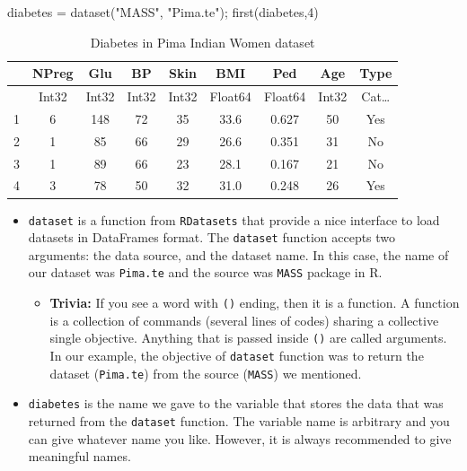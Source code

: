 \documentclass[
  letterpaper,
]{book}
\newenvironment{Shaded}{\begin{snugshade}}{\end{snugshade}}
\newcommand{\FloatTok}[1]{\textcolor[rgb]{0.68,0.00,0.00}{#1}}
\newcommand{\FunctionTok}[1]{\textcolor[rgb]{0.28,0.35,0.67}{#1}}
\newcommand{\NormalTok}[1]{\textcolor[rgb]{0.00,0.23,0.31}{#1}}
\newcommand{\OperatorTok}[1]{\textcolor[rgb]{0.37,0.37,0.37}{#1}}
\newcommand{\StringTok}[1]{\textcolor[rgb]{0.13,0.47,0.30}{#1}}
\providecommand{\tightlist}{%
  \setlength{\itemsep}{0pt}\setlength{\parskip}{0pt}}\usepackage{longtable,booktabs,array}
\begin{document}
\begin{Shaded}
\begin{Highlighting}[]
\NormalTok{diabetes }\OperatorTok{=} \FunctionTok{dataset}\NormalTok{(}\StringTok{"MASS"}\NormalTok{, }\StringTok{"Pima.te"}\NormalTok{);}
\FunctionTok{first}\NormalTok{(diabetes,}\FloatTok{4}\NormalTok{)}
\end{Highlighting}
\end{Shaded}

\hypertarget{tbl-pima}{}
\begin{table}
\caption{\label{tbl-pima}Diabetes in Pima Indian Women dataset }

\centering
\begin{tabular}{r|cccccccc}
    & NPreg & Glu & BP & Skin & BMI & Ped & Age & Type\\
    \hline
    & Int32 & Int32 & Int32 & Int32 & Float64 & Float64 & Int32 & Cat…\\
    \hline
    1 & 6 & 148 & 72 & 35 & 33.6 & 0.627 & 50 & Yes \\
    2 & 1 & 85 & 66 & 29 & 26.6 & 0.351 & 31 & No \\
    3 & 1 & 89 & 66 & 23 & 28.1 & 0.167 & 21 & No \\
    4 & 3 & 78 & 50 & 32 & 31.0 & 0.248 & 26 & Yes \\
\end{tabular}
\end{table}

\begin{itemize}
\tightlist
\item
  \texttt{dataset} is a function from \texttt{RDatasets} that provide a
  nice interface to load datasets in DataFrames format. The
  \texttt{dataset} function accepts two arguments: the data source, and
  the dataset name. In this case, the name of our dataset was
  \texttt{Pima.te} and the source was \texttt{MASS} package in R.

  \begin{itemize}
  \tightlist
  \item
    \textbf{Trivia:} If you see a word with \texttt{()} ending, then it
    is a function. A function is a collection of commands (several lines
    of codes) sharing a collective single objective. Anything that is
    passed inside \texttt{()} are called arguments. In our example, the
    objective of \texttt{dataset} function was to return the dataset
    (\texttt{Pima.te}) from the source (\texttt{MASS}) we mentioned.
  \end{itemize}
\item
  \texttt{diabetes} is the name we gave to the variable that stores the
  data that was returned from the \texttt{dataset} function. The
  variable name is arbitrary and you can give whatever name you like.
  However, it is always recommended to give meaningful names.
\end{itemize}
\end{document}

